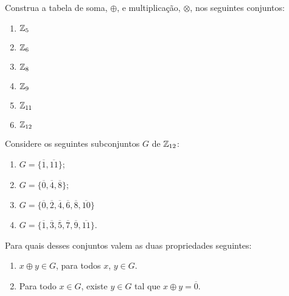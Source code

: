 \documentclass[12pt]{exam}
\begin{document}
    \vspace{.6cm}

     \questao{} Construa a tabela de soma, $\oplus$, e multiplicação, $\otimes$, nos seguintes conjuntos:
      \begin{multicols}{3}
        \begin{enumerate}[label=({\alph*})]
            \item $\mathbb{Z}_5$
            \item $\mathbb{Z}_6$
          \item $\mathbb{Z}_8$
          \item $\mathbb{Z}_9$
          \item $\mathbb{Z}_{11}$
          \item $\mathbb{Z}_{12}$
      \end{enumerate}
    \end{multicols}

    \vspace{.3cm}

    \questao{} Considere os seguintes subconjuntos $G$ de $\mathbb{Z}_{12}$:
    \begin{multicols}{2}
      \begin{enumerate}[label=({\alph*})]
          \item $G=\{\overline{1},\overline{11}\}$;

          \item $G=\{\overline{0},\overline{4},\overline{8}\}$;

          \item $G=\{\overline{0},\overline{2},\overline{4},\overline{6},\overline{8},\overline{10}\}$
          
          \item $G=\{\overline{1}, \overline{3},\overline{5},\overline{7},\overline{9},\overline{11}\}$.
      \end{enumerate}
    \end{multicols}

    Para quais desses conjuntos valem as duas propriedades seguintes:
    \begin{enumerate}[label=({\roman*})]
      \item $x \oplus y \in G$, para todos $x$, $y \in G$.
      \item Para todo $x \in G$, existe $y \in G$ tal que $x \oplus y = \overline{0}$.
    \end{enumerate}

    \vspace{.3cm}
\end{document}

